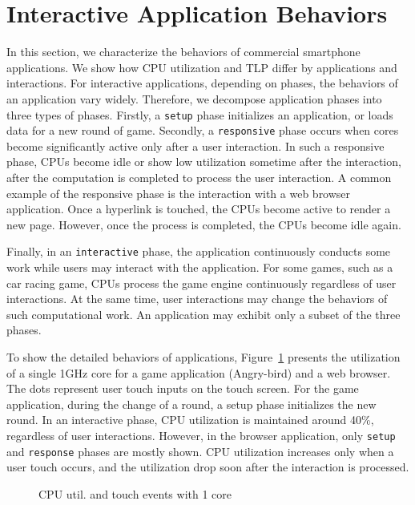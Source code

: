 \section{Interactive Application Behaviors}

In this section, we characterize the behaviors of commercial smartphone applications. 
We show how CPU utilization and TLP differ by applications and interactions.
For interactive applications, depending on phases, the behaviors of an application vary 
widely. Therefore, we decompose application phases into three types of phases. Firstly, a {\tt setup}
phase initializes an application, or loads data for a new round of game. Secondly,
a {\tt responsive} phase occurs when cores become significantly active only after a user interaction.
In such a responsive phase, CPUs become idle or show low utilization sometime after the interaction, after
the computation is completed to process the user interaction. A common example of
the responsive phase is the interaction with a web browser application. Once
a hyperlink is touched, the CPUs become active to render a new page. However,
once the process is completed, the CPUs become idle again.

Finally, in an {\tt interactive} phase, the application continuously conducts some work
while users may interact with the application. For some games, such as a car racing game,
CPUs process the game engine continuously regardless of user interactions. At the same time,
user interactions may change the behaviors of such computational work.
An application may exhibit only a subset of the three phases. 

To show the detailed behaviors of applications, Figure~\ref{fig:interact_util_1cpu} presents
the utilization of a single 1GHz core for a game application (Angry-bird) and a web browser.
The dots represent user touch inputs on the touch screen.
For the game application, during
the change of a round, a setup phase initializes the new round. In an interactive phase,
CPU utilization is maintained around 40\%, regardless of user interactions. 
However, in the browser application, only {\tt setup} and {\tt response} phases are mostly
shown. CPU utilization increases only when a user touch occurs, and the utilization
drop soon after the interaction is processed.

\begin{figure}[bt]
\begin{center}
\vspace{-0.45in}
\vspace{0.01in}
\end{center}
\caption{CPU util. and touch events with 1 core}
\vspace{-0.2in}
\label{fig:interact_util_1cpu} 
\end{figure}

